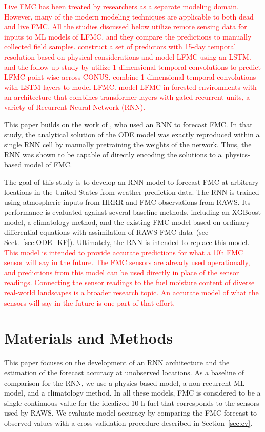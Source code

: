 \documentclass[fire,article,submit,pdftex,moreauthors]{Definitions/mdpi}
\begin{document}
\textcolor{red}{Live FMC has been treated by researchers as a separate modeling domain. However, many of the modern modeling techniques are applicable to both dead and live FMC. All the studies discussed below utilize remote sensing data for inputs to ML models of LFMC, and they compare the predictions to manually collected field samples. \citet{Rao-2020-SEM} construct a set of predictors with 15-day temporal resolution based on physical considerations and model LFMC using an LSTM. \citet{Zhu-2021-LFM} and the follow-up study by \citet{Miller-2023-PLF} utilize 1-dimensional temporal convolutions to predict LFMC point-wise across CONUS. \citet{Xie-2022-RLF} combine 1-dimensional temporal convolutions with LSTM layers to model LFMC. \citet{Wang-2025-NAI} model LFMC in forested environments with an architecture that combines transformer layers with gated recurrent units, a variety of Recurrent Neural Network (RNN).}

This paper builds on the work of \citet{Mandel-2023-BFM}, who used an RNN to forecast FMC. In that study, the analytical solution of the ODE model was exactly reproduced within a single RNN cell by manually pretraining the weights of the network. Thus, the RNN was shown to be capable of directly encoding the solutions to a~physics-based model of FMC.

The goal of this study is to develop an RNN model to forecast FMC at arbitrary locations in the United States from weather prediction data. The RNN is trained using atmospheric inputs from HRRR and FMC observations from RAWS. Its performance is evaluated against several baseline methods, including an XGBoost model, a climatology method, and the existing FMC model based on ordinary differential equations with assimilation of RAWS FMC data~\citep{Vejmelka-2014-DAF,Vejmelka-2016-DAD}(see Sect.~\ref{sec:ODE_KF}). Ultimately, the RNN is intended to replace this model. \textcolor{red}{This model is intended to provide accurate predictions for what a 10h FMC sensor will say in the future. The FMC sensors are already used operationally, and predictions from this model can be used directly in place of the sensor readings. Connecting the sensor readings to the fuel moisture content of diverse real-world landscapes is a broader research topic. An accurate model of what the sensors will say in the future is one part of that effort.}

\section{Materials and Methods}
This paper focuses on the development of an RNN architecture and the estimation of the forecast accuracy at unobserved locations. As a baseline of comparison for the RNN, we use a physics-based model, a non-recurrent ML model, and a climatology method. In all these models, FMC is considered to be a single continuous value for the idealized 10-h fuel that corresponds to the sensors used by RAWS. We evaluate model accuracy by comparing the FMC forecast to observed values with a cross-validation procedure described in Section~\ref{sec:cv}. 
\end{document}

